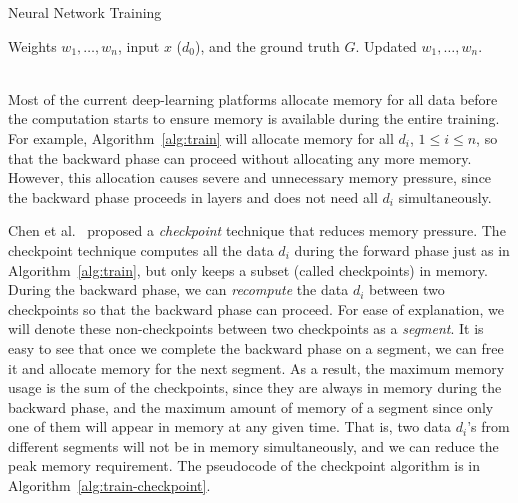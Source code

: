 \begin{algorithm}
\begin{algorithmic}
\caption{Neural Network Training}
\label{alg:train}
\Require Weights $w_1, \ldots, w_n$, input $x$ ($d_0$), and the ground truth $G$.
\Ensure Updated $w_1, \ldots, w_n$.\\
                 
\EndFor
\\ 
     
     
\EndFor 
\end{algorithmic}
\end{algorithm}

Most of the current deep-learning platforms allocate memory for all data before the computation starts to ensure memory is available during the entire training.
For example, Algorithm~\ref{alg:train} will allocate memory for all $d_i$, $1 \leq i \leq n$, so that the backward phase can proceed without allocating any more memory.
However, this allocation causes severe and unnecessary memory pressure, since the backward phase proceeds in layers and does not need all $d_i$ simultaneously.

Chen et al.~\cite{chen2016training} proposed a {\em checkpoint} technique that reduces memory pressure.
The checkpoint technique computes all the data $d_i$ during the forward phase just as in Algorithm~\ref{alg:train}, but only keeps a subset (called checkpoints) in memory. 
During the backward phase, we can {\em recompute} the data $d_i$ between two checkpoints so that the backward phase can proceed.
For ease of explanation, we will denote these non-checkpoints between two checkpoints as a {\em segment}.
It is easy to see that once we complete the backward phase on a segment, we can free it and allocate memory for the next segment.
As a result, the maximum memory usage is the sum of the checkpoints, since they are always in memory during the backward phase, and the maximum amount of memory of a segment since only one of them will appear in memory at any given time.
That is, two data $d_i$'s from different segments will not be in memory simultaneously, and we can reduce the peak memory requirement.
The pseudocode of the checkpoint algorithm is in Algorithm~\ref{alg:train-checkpoint}.

